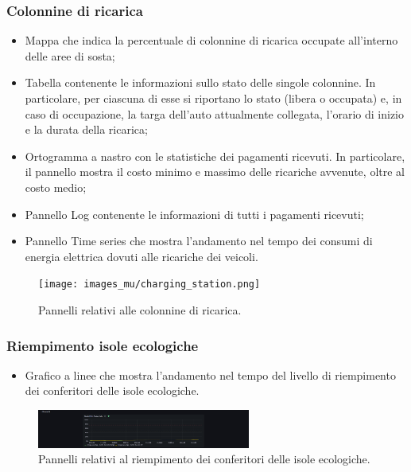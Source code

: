 \documentclass[8pt]{article}
\begin{document}
\subsubsection{Colonnine di ricarica}
\begin{itemize}
\setlength\itemsep{0em}
    \item Mappa che indica la percentuale di colonnine di ricarica occupate all'interno delle aree di sosta;
    \item Tabella contenente le informazioni sullo stato delle singole colonnine. In particolare, per ciascuna di esse si riportano lo stato (libera o occupata) e, in caso di occupazione, la targa dell'auto attualmente collegata, l'orario di inizio e la durata della ricarica;
    \item Ortogramma a nastro con le statistiche dei pagamenti ricevuti. In particolare, il pannello mostra il costo minimo e massimo delle ricariche avvenute, oltre al costo medio;
    \item Pannello Log contenente le informazioni di tutti i pagamenti ricevuti;
    \item Pannello Time series che mostra l'andamento nel tempo dei consumi di energia elettrica dovuti alle ricariche dei veicoli.
\end{itemize}
\begin{figure}[H]
    \centering
    \texttt{[image: images\_mu/charging\_station.png]}
    \caption{Pannelli relativi alle colonnine di ricarica.}
    \label{fig:Pannelli relativi alle colonnine di ricarica.}
\end{figure}
\subsubsection{Riempimento isole ecologiche}
\begin{itemize}
\setlength\itemsep{0em}
    \item Grafico a linee che mostra l'andamento nel tempo del livello di riempimento dei conferitori delle isole ecologiche.
\end{itemize}
\begin{figure}[H]
    \centering
    \includegraphics[width=7cm]{images_mu/waste_fill.png}
    \caption{Pannelli relativi al riempimento dei conferitori delle isole ecologiche.}
    \label{fig:Pannelli relativi al riempimento dei conferitori delle isole ecologiche}
\end{figure}
\end{document}
